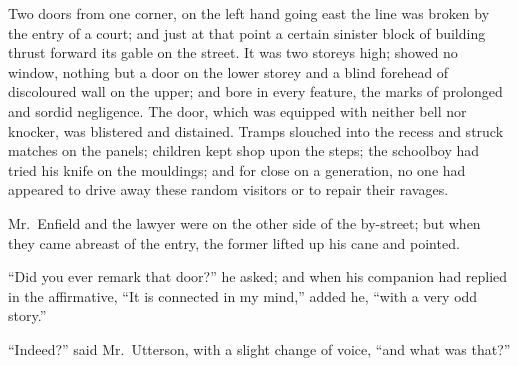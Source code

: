 \documentclass[12pt,openright]{book}
\begin{document}
Two doors from one corner, on the left hand going east the line was broken by the entry of a court; and just at that point a certain sinister block of building thrust forward its gable on the street. It was two storeys high; showed no window, nothing but a door on the lower storey and a blind forehead of discoloured wall on the upper; and bore in every feature, the marks of prolonged and sordid negligence. The door, which was equipped with neither bell nor knocker, was blistered and distained. Tramps slouched into the recess and struck matches on the panels; children kept shop upon the steps; the schoolboy had tried his knife on the mouldings; and for close on a generation, no one had appeared to drive away these random visitors or to repair their ravages.

Mr. Enfield and the lawyer were on the other side of the by-street; but when they came abreast of the entry, the former lifted up his cane and pointed.

“Did you ever remark that door?” he asked; and when his companion had replied in the affirmative, “It is connected in my mind,” added he, “with a very odd story.”

“Indeed?” said Mr. Utterson, with a slight change of voice, “and what was that?”
\end{document}
